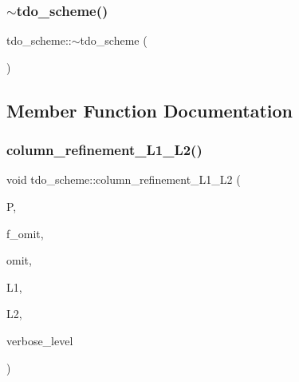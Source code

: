 \subsubsection{\texorpdfstring{$\sim$tdo\+\_\+scheme()}{~tdo\_scheme()}}
{\footnotesize\ttfamily tdo\+\_\+scheme\+::$\sim$tdo\+\_\+scheme (\begin{DoxyParamCaption}{ }\end{DoxyParamCaption})}



\subsection{Member Function Documentation}
\mbox{\label{classtdo__scheme_ad129f230e11ec9e767abbeb39b50ea47}} 
\subsubsection{\texorpdfstring{column\+\_\+refinement\+\_\+\+L1\+\_\+\+L2()}{column\_refinement\_L1\_L2()}}
{\footnotesize\ttfamily void tdo\+\_\+scheme\+::column\+\_\+refinement\+\_\+\+L1\+\_\+\+L2 (\begin{DoxyParamCaption}\item[{\mbox{\hyperlink{classpartitionstack}{partitionstack}} \&}]{P,  }\item[{\mbox{\hyperlink{galois_8h_a09fddde158a3a20bd2dcadb609de11dc}{I\+NT}}}]{f\+\_\+omit,  }\item[{\mbox{\hyperlink{galois_8h_a09fddde158a3a20bd2dcadb609de11dc}{I\+NT}}}]{omit,  }\item[{\mbox{\hyperlink{galois_8h_a09fddde158a3a20bd2dcadb609de11dc}{I\+NT}} \&}]{L1,  }\item[{\mbox{\hyperlink{galois_8h_a09fddde158a3a20bd2dcadb609de11dc}{I\+NT}} \&}]{L2,  }\item[{\mbox{\hyperlink{galois_8h_a09fddde158a3a20bd2dcadb609de11dc}{I\+NT}}}]{verbose\+\_\+level }\end{DoxyParamCaption})}

\mbox{\label{classtdo__scheme_a2474c22639d8963a90448ab2686ac449}} 
